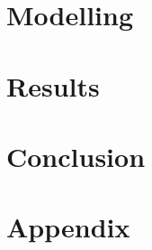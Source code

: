 \documentclass[
11pt, %
a4paper, %
oneside, %
headinclude,footinclude, %
BCOR5mm, %
]{report}
\begin{document}



\chapter{Modelling}\label{chp:Modelling}



\chapter{Results}\label{chp:Results}


\chapter{Conclusion}\label{chp:Conclusion}




\renewcommand{\refname}{\spacedlowsmallcaps{References}} %



\newpage
\appendix
\appendixpage
\chapter{Appendix}

\end{document}
